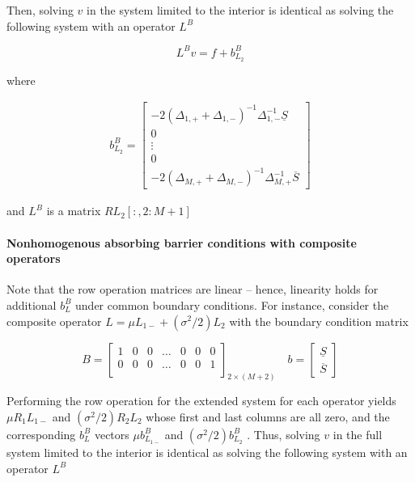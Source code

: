 \documentclass[11pt]{article}
\theoremstyle{definition}
\begin{document}
Then, solving $v$ in the system limited to the interior is identical as solving the following system with an operator $L^B$ 

\begin{equation}
L^Bv= f + b_{L_2}^B
\end{equation}

where 

\begin{align}
b_{L_2}^B = \begin{bmatrix}
-2(\Delta_{1,+} + \Delta_{1,-})^{-1} \Delta_{1,-}^{-1} \underline{S} \\ 0 \\ \vdots \\ 0 \\
-2(\Delta_{M,+} + \Delta_{M,-})^{-1} \Delta_{M,+}^{-1} \overline{S}
\end{bmatrix}
\end{align}

and $L^B$ is a matrix $RL_{2}[:,2:M+1]$

\paragraph{Nonhomogenous absorbing barrier conditions with composite operators} Note that the row operation matrices are linear -- hence, linearity holds for additional $b^B_L$ under common boundary conditions. For instance, consider the composite operator $L = \mu L_{1-} + ({\sigma^2}/{2}) L_2$ with the boundary condition matrix

\begin{equation}
B = \begin{bmatrix}
1 & 0 & 0 & \dots & 0 & 0 & 0 \\
0 & 0 & 0 & \dots & 0 &  0 & 1\\
\end{bmatrix}_{2 \times (M+2)} \quad
b = \begin{bmatrix}
\underline{S} \\
\overline{S}
\end{bmatrix}
\end{equation} 

Performing the row operation for the extended system for each operator yields $\mu R_1  L_{1-} $ and $(\sigma^2/2) R_2 L_2$ whose first and last columns are all zero, and the corresponding $b^B_L$ vectors $\mu b^B_{L_{1-}}$ and $(\sigma^2 / 2) b^B_{L_2}$ . Thus, solving $v$ in the full system limited to the interior is identical as solving the following system with an operator $L^B$
\end{document}
